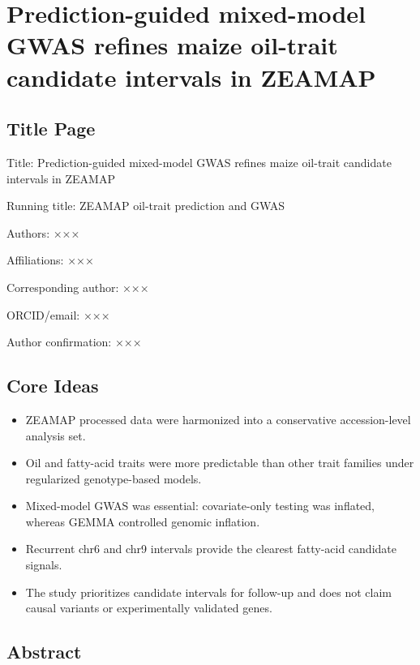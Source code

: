 \documentclass[
]{article}
\author{}
\date{}
\providecommand{\tightlist}{%
  \setlength{\itemsep}{0pt}\setlength{\parskip}{0pt}}
\begin{document}
\section{Prediction-guided mixed-model GWAS refines maize oil-trait
candidate intervals in
ZEAMAP}\label{prediction-guided-mixed-model-gwas-refines-maize-oil-trait-candidate-intervals-in-zeamap}

\subsection{Title Page}\label{title-page}

Title: Prediction-guided mixed-model GWAS refines maize oil-trait
candidate intervals in ZEAMAP

Running title: ZEAMAP oil-trait prediction and GWAS

Authors: ×××

Affiliations: ×××

Corresponding author: ×××

ORCID/email: ×××

Author confirmation: ×××

\subsection{Core Ideas}\label{core-ideas}

\begin{itemize}
\tightlist
\item
  ZEAMAP processed data were harmonized into a conservative
  accession-level analysis set.
\item
  Oil and fatty-acid traits were more predictable than other trait
  families under regularized genotype-based models.
\item
  Mixed-model GWAS was essential: covariate-only testing was inflated,
  whereas GEMMA controlled genomic inflation.
\item
  Recurrent chr6 and chr9 intervals provide the clearest fatty-acid
  candidate signals.
\item
  The study prioritizes candidate intervals for follow-up and does not
  claim causal variants or experimentally validated genes.
\end{itemize}

\subsection{Abstract}\label{abstract}
\end{document}

